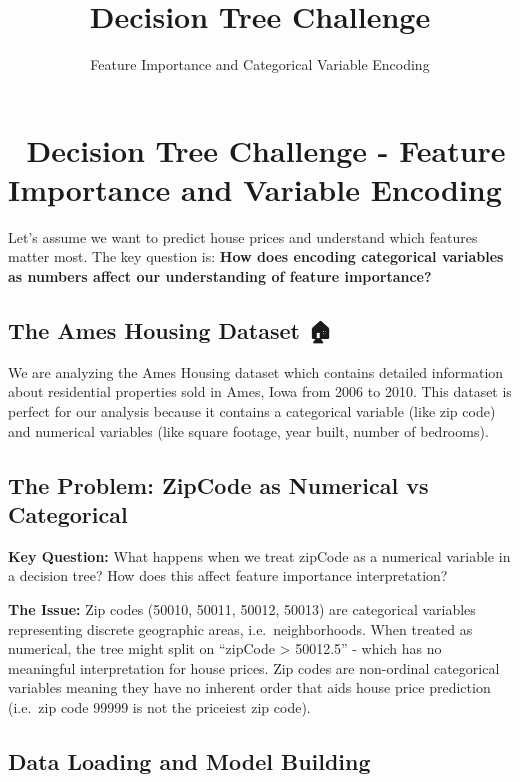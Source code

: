 \documentclass[
  letterpaper,
  DIV=11,
  numbers=noendperiod]{scrartcl}
\title{Decision Tree Challenge}
\subtitle{Feature Importance and Categorical Variable Encoding}
\author{}
\date{}
\begin{document}
\maketitle


\section{🌳 Decision Tree Challenge - Feature Importance and Variable
Encoding}\label{decision-tree-challenge---feature-importance-and-variable-encoding}

Let's assume we want to predict house prices and understand which
features matter most. The key question is: \textbf{How does encoding
categorical variables as numbers affect our understanding of feature
importance?}

\subsection{The Ames Housing Dataset 🏠}\label{the-ames-housing-dataset}

We are analyzing the Ames Housing dataset which contains detailed
information about residential properties sold in Ames, Iowa from 2006 to
2010. This dataset is perfect for our analysis because it contains a
categorical variable (like zip code) and numerical variables (like
square footage, year built, number of bedrooms).

\subsection{The Problem: ZipCode as Numerical vs
Categorical}\label{the-problem-zipcode-as-numerical-vs-categorical}

\textbf{Key Question:} What happens when we treat zipCode as a numerical
variable in a decision tree? How does this affect feature importance
interpretation?

\textbf{The Issue:} Zip codes (50010, 50011, 50012, 50013) are
categorical variables representing discrete geographic areas,
i.e.~neighborhoods. When treated as numerical, the tree might split on
``zipCode \textgreater{} 50012.5'' - which has no meaningful
interpretation for house prices. Zip codes are non-ordinal categorical
variables meaning they have no inherent order that aids house price
prediction (i.e.~zip code 99999 is not the priceiest zip code).

\subsection{Data Loading and Model
Building}\label{data-loading-and-model-building}
\end{document}
